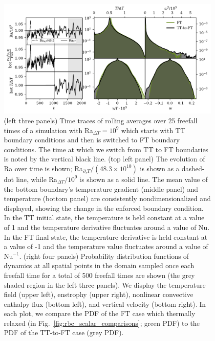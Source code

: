 \documentclass[aps, pre, onecolumn, nofootinbib, notitlepage, groupedaddress, amsfonts, amssymb, amsmath, longbibliography, superscriptaddress]{revtex4-1}
\begin{document}
\begin{figure}
\includegraphics[width=\textwidth]{./figs/rbc_restart_description.pdf}
\caption{ 
	(left three panels) Time traces of rolling averages over 25 freefall times of a simulation with Ra$_{\Delta T} = 10^9$ which starts with TT boundary conditions and then is switched to FT boundary conditions.
	The time at which we switch from TT to FT boundaries is noted by the vertical black line.
	(top left panel) The evolution of Ra over time is shown; Ra$_{\partial_z T}/(48.3\times 10^{10})$ is shown as a dashed-dot line, while Ra$_{\Delta T}/10^9$ is shown as a solid line.
	The mean value of the bottom boundary's temperature gradient (middle panel) and temperature (bottom panel) are consistently nondimensionalized and displayed, showing the change in the enforced boundary condition.
	In the TT initial state, the temperature is held constant at a value of 1 and the temperature derivative fluctuates around a value of $\text{Nu}$.
	In the FT final state, the temperature derivative is held constant at a value of -1 and the temperature value fluctuates around a value of $\text{Nu}^{-1}$.
	(right four panels) Probability distribution functions of dynamics at all spatial points in the domain sampled once each freefall time for a total of 500 freefall times are shown (the grey shaded region in the left three panels).
	We display the temperature field (upper left), enstrophy (upper right), nonlinear convective enthalpy flux (bottom left), and vertical velocity (bottom right).
	In each plot, we compare the PDF of the FT case which thermally relaxed (in Fig.~\ref{fig:rbc_scalar_comparisons}; green PDF) to the PDF of the TT-to-FT case (grey PDF).
\label{fig:rbc_restart_description} }
\end{figure}
\end{document}
